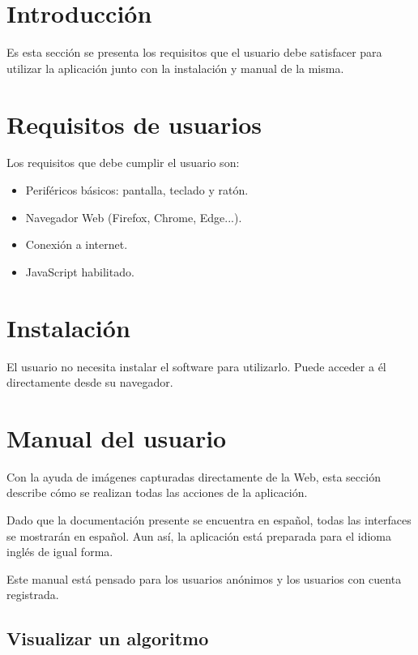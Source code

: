 
\section{Introducción}

Es esta sección se presenta los requisitos que el usuario debe satisfacer para
utilizar la aplicación junto con la instalación y manual de la misma.

\section{Requisitos de usuarios}

Los requisitos que debe cumplir el usuario son:
\begin{itemize}
    \item Periféricos básicos: pantalla, teclado y ratón.
    \item Navegador Web (Firefox, Chrome, Edge...).
    \item Conexión a internet.
    \item JavaScript habilitado.
\end{itemize}

\section{Instalación}

El usuario no necesita instalar el software para utilizarlo. Puede acceder a él
directamente desde su navegador.

\section{Manual del usuario}

Con la ayuda de imágenes capturadas directamente de la Web, esta sección
describe cómo se realizan todas las acciones de la aplicación.

Dado que la documentación presente se encuentra en español, todas las interfaces
se mostrarán en español. Aun así, la aplicación está preparada para el idioma
inglés de igual forma.

Este manual está pensado para los usuarios anónimos y los usuarios con cuenta
registrada.

\subsection{Visualizar un algoritmo}

